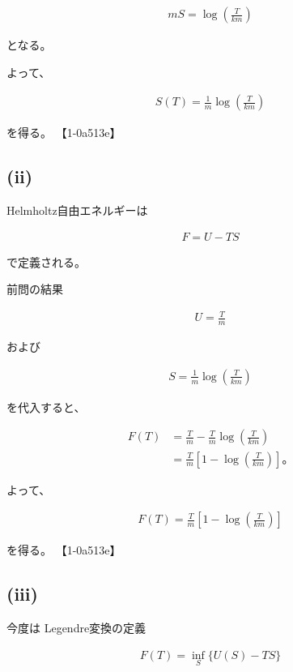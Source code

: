 \documentclass[platex,dvipdfmx,a4paper]{jsarticle}
\begin{document}
\begin{align*}
mS
=
\log
\left(
\frac{T}{km}
\right)
\end{align*}

となる。

よって、

\begin{align*}
S(T)
=
\frac{1}{m}
\log
\left(
\frac{T}{km}
\right)
\end{align*}

を得る。 【1-0a513e】

\subsection{(ii)}

Helmholtz自由エネルギーは

\begin{align*}
F=U-TS
\end{align*}

で定義される。

前問の結果

\begin{align*}
U=\frac{T}{m}
\end{align*}

および

\begin{align*}
S
=
\frac1m
\log
\left(
\frac{T}{km}
\right)
\end{align*}

を代入すると、

\begin{align*}
F(T)
&=
\frac{T}{m}
-
\frac{T}{m}
\log
\left(
\frac{T}{km}
\right)
\\
&=
\frac{T}{m}
\left[
1-
\log
\left(
\frac{T}{km}
\right)
\right]。
\end{align*}

よって、

\begin{align*}
F(T)
=
\frac{T}{m}
\left[
1-
\log
\left(
\frac{T}{km}
\right)
\right]
\end{align*}

を得る。 【1-0a513e】

\subsection{(iii)}

今度は Legendre変換の定義

\begin{align*}
F(T)
=
\inf_S
\{U(S)-TS\}
\end{align*}
\end{document}
